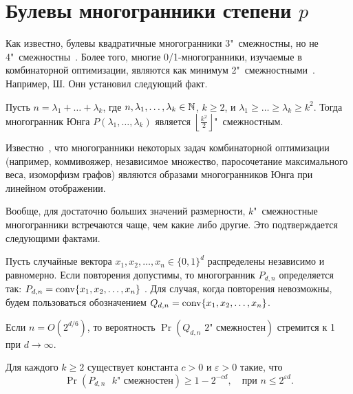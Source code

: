 \section{\texorpdfstring{Булевы многогранники степени $p$}{Булевы многогранники степени p}}
\label{sec:BQP-power}

Как известно, булевы квадратичные многогранники 3"~смежностны, но не 4"~смежностны~\cite{Deza:1992}.
Более того, многие 0/1-многогранники, изучаемые в комбинаторной оптимизации, являются как минимум 2"~смежностными~\cite[p. 366]{Henk:2004}. %
Например, Ш. Онн установил следующий факт.

\begin{theorem}
	Пусть $n = \lambda_1 + \ldots + \lambda_k$, где $n, \lambda_1, \ldots, \lambda_k \in \mathbb{N}$, 
	$k \ge 2$, и $\lambda_1 \ge \ldots \ge \lambda_k \ge k^2$.
	Тогда многогранник Юнга $P(\lambda_1, \ldots, \lambda_k)$ 
	является $\left\lfloor \frac{k^2}2 \right\rfloor$"~смежностным.
\end{theorem}

{\sloppy
Известно~\cite{Barvinok:1988, Onn:1993}, что многогранники некоторых задач комбинаторной оптимизации 
(например, коммивояжер, независимое множество, паросочетание максимального веса, изоморфизм графов)
являются образами многогранников Юнга при линейном отображении.

}

Вообще, для достаточно больших значений размерности, 
$k$"~смежностные многогранники встречаются чаще, чем какие либо другие.
Это подтверждается следующими фактами.

Пусть случайные вектора $x_1, x_2, \ldots, x_n \in \{0,1\}^d$ распределены независимо и равномерно.
Если повторения допустимы, то многогранник $P_{d,n}$ определяется так:
$P_{d,n} = \operatorname{conv}\{x_1, x_2, \ldots, x_n\}$ \cite{Gillmann:2006}.
Для случая, когда повторения невозможны, будем пользоваться обозначением
$Q_{d,n} = \operatorname{conv}\{x_1, x_2, \ldots, x_n\}$. 

\begin{theorem}
	Если $n = O(2^{d/6})$, то вероятность $\Pr(Q_{d,n}\mbox{ 2"~смежностен})$ 
	стремится к 1 при $d \rightarrow \infty$.
\end{theorem}

\begin{theorem}
	Для каждого $k \ge 2$ существует константа $c > 0$ и $\varepsilon > 0$ %
	такие, что
	\[
	\Pr(P_{d,n}\mbox{ $k$"~смежностен}) \ge 1 - 2^{-c d}, \quad \text{при }n \le 2^{\varepsilon d}.
	\] 
\end{theorem}

